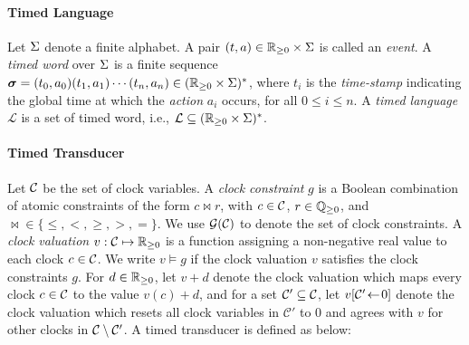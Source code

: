         \paragraph{Timed Language}
        Let $\Sigma$ denote a finite alphabet. A pair $(t, a)\in\mathbb{R}_{\ge 0}\times\Sigma$ is called an \emph{event}. A \emph{timed word} over $\Sigma$ is a finite sequence $\bm{\sigma}=(t_0,a_0)(t_1,a_1)\cdots(t_n,a_n)\allowbreak\in(\mathbb{R}_{\ge 0}\times\Sigma)^*$, where $t_i$ is the \emph{time-stamp} indicating the global time at which the \emph{action} $a_i$ occurs, for all $0\le i \le n$. A \emph{timed language} $\mathcal{L}$ is a set of timed word, i.e., $\mathcal{L}\subseteq(\mathbb{R}_{\ge 0} \times \Sigma)^*$. %

        
         \paragraph{Timed Transducer}
         Let $\mathcal{C}$ be the set of clock variables. A \emph{clock constraint} $g$ is a Boolean combination of atomic constraints of the form $c\!\Join\! r$, with $c\in\mathcal{C}$, $r\in \mathbb{Q}_{\ge 0}$, and $\Join\in\{\le,<,\ge,>,=\}$. We use $\mathcal{G}(\mathcal{C})$ to denote the set of clock constraints. A \emph{clock valuation} $v:\mathcal{C}\mapsto\mathbb{R}_{\ge 0}$ is a function assigning a non-negative real value to each clock $c\in\mathcal{C}$. We write $v\models g$ if the clock valuation $v$ satisfies the clock constraints $g$. For $d\in\mathbb{R}_{\ge 0}$, let $v+d$ denote the clock valuation which maps every clock $c\in\mathcal{C}$ to the value $v(c)+d$, and for a set $\mathcal{C}'\subseteq\mathcal{C}$, let ${v}[\mathcal{C}'\!\leftarrow\!0]$ denote the clock valuation which resets all clock variables in $\mathcal{C}'$ to $0$ and agrees with $v$ for other clocks in $\mathcal{C}\setminus\mathcal{C}'$. A timed transducer is defined as below:

